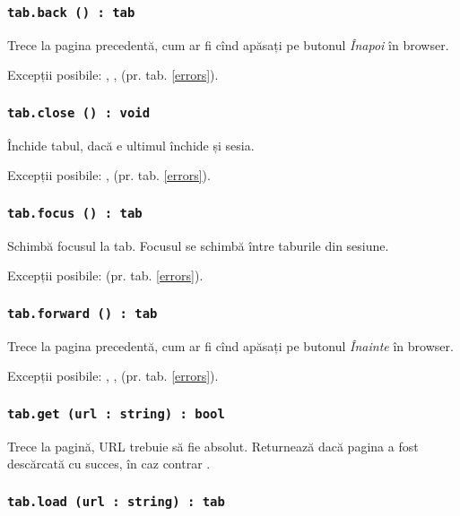 \subsubsection{\texttt{tab.back () : tab}}

Trece la pagina precedentă, cum ar fi cînd apăsați pe butonul \textit{Înapoi} în browser.

Excepții posibile: , ,  (pr. tab. \ref{errors}).

\subsubsection{\texttt{tab.close () : void}}

Închide tabul, dacă e ultimul închide și sesia.

Excepții posibile: ,  (pr. tab. \ref{errors}).

\subsubsection{\texttt{tab.focus () : tab}}

Schimbă focusul la tab. Focusul se schimbă între taburile din sesiune.

Excepții posibile:  (pr. tab. \ref{errors}).

\subsubsection{\texttt{tab.forward () : tab}}

Trece la pagina precedentă, cum ar fi cînd apăsați pe butonul \textit{Înainte} în browser.


Excepții posibile: , ,  (pr. tab. \ref{errors}).

\subsubsection{\texttt{tab.get (url : string) : bool}}

Trece la pagină, URL trebuie să fie absolut. Returnează \true{} dacă pagina a fost descărcată cu succes, în caz contrar \false.

\subsubsection{\texttt{tab.load (url : string) : tab}}

